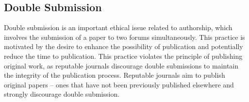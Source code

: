 \documentclass{article}
\begin{document}
	\subsection{Double Submission}
	Double submission is an important ethical issue related to authorship, which involves the submission of a
	paper to two forums simultaneously.
	This practice is motivated by the desire to enhance the possibility of publication and potentially reduce
	the time to publication.
	This practice violates the principle of publishing original work, as reputable journals discourage double
	submissions to maintain the integrity of the publication process.
	Reputable journals aim to publish original papers -- ones that have not been previously published
	elsewhere and strongly discourage double submission.
\end{document}
